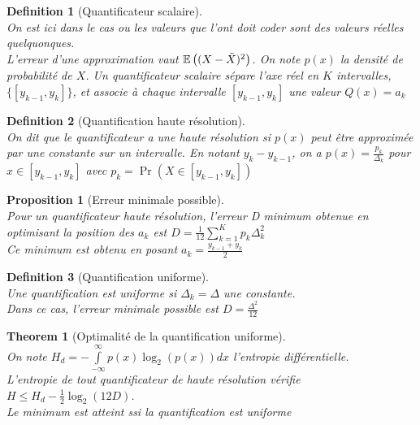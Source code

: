 \documentclass[a4paper]{article}
\newtheorem*{prop}{Proposition}
\newtheorem*{definition}{Definition}
\newtheorem*{theorem}{Theorem}
\newcommand{\E}{\ensuremath\mathbb{E}}
\renewcommand{\leq}{\leqslant}
\renewcommand{\(}{\left(}
\renewcommand{\)}{\right)}
\begin{document}
\begin{definition}[Quantificateur scalaire]~\\
On est ici dans le cas ou les valeurs que l'ont doit coder sont des valeurs
réelles quelquonques.\\
L'erreur d'une approximation vaut $\E\((X-\tilde{X})^2\)$.
On note $p(x)$ la densité de probabilité de $X$.
Un quantificateur scalaire sépare l'axe réel en $K$ intervalles,
$\{[y_{k-1},y_{k}]\}$, et associe à chaque intervalle $[y_{k-1},y_{k}]$ une valeur $Q(x) = a_k$
\end{definition}

\begin{definition}[Quantification haute résolution]~\\
  On dit que le quantificateur a une haute résolution si $p(x)$ peut être
  approximée par une constante sur un intervalle. En notant $y_k-y_{k-1}$, on a
  $p(x) = \frac{p_k}{\Delta_k}$ pour $x \in [y_{k-1},y_{k}]$ avec $p_k = \Pr(X \in [y_{k-1},y_{k}])$
\end{definition}

\begin{prop}[Erreur minimale possible]~\\
  Pour un quantificateur haute résolution, l'erreur D minimum obtenue en
  optimisant la position des $a_k$ est
  $D = \frac{1}{12}\sum\limits_{k=1}^{K}p_k \Delta_k^2$\\
  Ce minimum est obtenu en posant $a_k = \frac{y_{k-1}+y_k}{2}$\\
\end{prop}

\begin{definition}[Quantification uniforme]~\\
  Une quantification est uniforme si $\Delta_k = \Delta$ une constante.\\
  Dans ce cas, l'erreur minimale possible est $D = \frac{\Delta^2}{12}$
\end{definition}


\begin{theorem}[Optimalité de la quantification uniforme]~\\
  On note $H_d = -\int\limits_{-\infty}^{\infty}p(x) \log_2\(p(x)\)dx$
  l'entropie différentielle.\\
  L'entropie de tout quantificateur de haute résolution vérifie
  $H \leq H_d - \frac{1}{2}\log_2(12D)$.\\
  Le minimum est atteint ssi la quantification est uniforme
\end{theorem}
\end{document}
